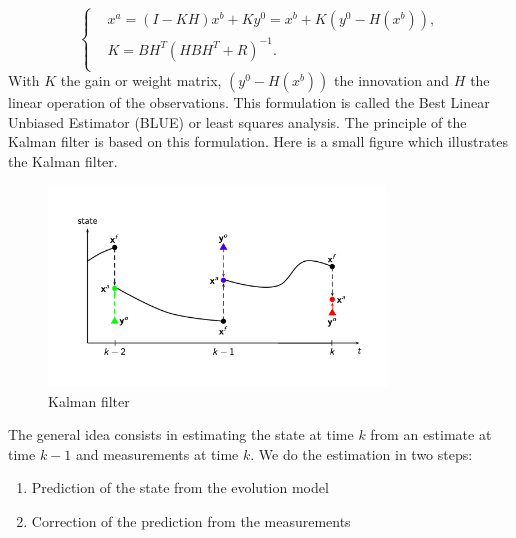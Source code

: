 $$\left\{\begin{aligned}
		&x^a=(I-KH)x^b+Ky^0=x^b+K(y^0-H(x^b)), \\
        &K=BH^T(HBH^T+R)^{-1}. \\
	\end{aligned}\right.$$
With $K$ the gain or weight matrix, $(y^0-H(x^b))$ the innovation and $H$ the linear operation of the observations.
This formulation is called the Best Linear Unbiased Estimator (BLUE) or least squares analysis.
The principle of the Kalman filter is based on this formulation. Here is a small figure which illustrates the Kalman filter.
\vspace*{5mm}
\begin{figure}[H]
    \centering
		\includegraphics[width=0.8\textwidth]{"images/enkf/schema_kalman_filter.png"}
	\caption{Kalman filter}
\end{figure}
The general idea consists in estimating the state at time $k$ from an estimate at time $k-1$ and measurements at time $k$.
We do the estimation in two steps:
\begin{enumerate}[label=\textbullet]
		\item Prediction of the state from the evolution model
		\item Correction of the prediction from the measurements
	\end{enumerate}

